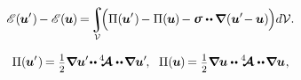 \nopagebreak\vspace{-0.2em}\begin{equation*}
\potentialenergyfunctional \hspace{.16ex} (\hspace{-0.1ex}\bm{u}'\hspace{.1ex}) \hspace{-0.2ex} -
\potentialenergyfunctional \hspace{.16ex} (\hspace{-0.1ex}\bm{u}\hspace{-0.1ex}) \hspace{-0.2ex}
= \hspace{-0.3ex}
\scalebox{0.9}{$\displaystyle\integral\displaylimits_{\mathcal{V}}$} \hspace{-0.44ex}
\Bigl(
\potential(\hspace{-0.1ex}\bm{u}'\hspace{.1ex}) \hspace{-0.2ex}
- \potential(\hspace{-0.1ex}\bm{u}\hspace{-0.1ex}) \hspace{-0.2ex}
- \linearstress \dotdotp \hspace{-0.1ex} \boldnabla \hspace{.1ex} ( \bm{u}' \hspace{-0.4ex} - \hspace{-0.1ex} \bm{u} ) \hspace{-0.1ex}
\Bigr) d\mathcal{V}
.
\end{equation*}

\noindent
{}

\begin{equation*}
\potential(\hspace{-0.1ex}\bm{u}'\hspace{.1ex}) \hspace{-0.2ex} = \smalldisplaystyleonehalf \boldnabla \bm{u}' \hspace{-0.4ex} \dotdotp \hspace{-0.1ex} \stiffnesstensor \dotdotp \hspace{-0.25ex} \boldnabla \bm{u}'
\hspace{-0.2ex} ,
\hspace{.6em}
\potential(\hspace{-0.1ex}\bm{u}\hspace{-0.1ex}) \hspace{-0.2ex} = \smalldisplaystyleonehalf \boldnabla \bm{u} \dotdotp \stiffnesstensor \dotdotp \hspace{-0.25ex} \boldnabla \bm{u}
\hspace{.1ex} ,
\end{equation*}


